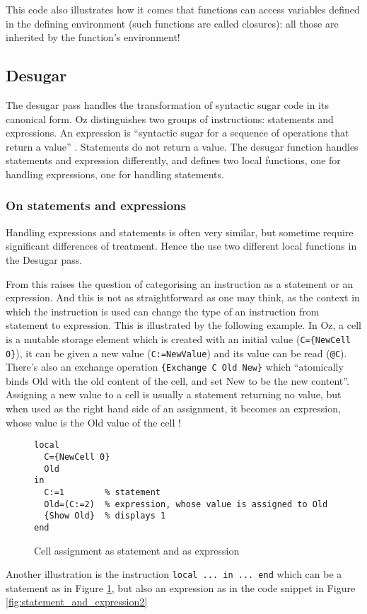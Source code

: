 \documentclass[a4paper]{memoir}
\begin{document}
This code also illustrates how it comes that functions can access variables defined in the defining environment (such functions are called closures): all those are inherited by the function's environment!




\subsection{Desugar}\label{sec:arch:desugar}
The desugar pass handles the transformation of syntactic sugar code in its canonical form.
Oz distinguishes two groups of instructions: statements and expressions. An expression is ``syntactic sugar for a sequence of operations that return a value'' . Statements do not return a value.
The desugar function handles statements and expression differently, and defines two local functions, one for handling expressions, one for handling statements.
\subsubsection{On statements and expressions}
Handling expressions and statements is often very similar, but sometime require significant differences of treatment. Hence the use two different local functions in the Desugar pass.

From this raises the question of categorising an instruction as a statement or an expression. And this is not as straightforward as one may think, as the context in which the instruction is used can change the type of an instruction from statement to expression. This is illustrated by the following example.
In Oz, a cell is a mutable storage element which is created with an initial value (\lstinline!C={NewCell 0}!), it can be given a new value (\lstinline!C:=NewValue!) and its value can be read (\lstinline!@C!). There's also an exchange operation \lstinline!{Exchange C Old New}! which ``atomically binds Old with the old content of the cell, and set New to be the new content''.%
Assigning a new value to a cell is usually a statement returning no value, but when used as the right hand side of an assignment, it becomes an expression, whose value is the Old value of the cell !
\begin{figure}[h]
\begin{lstlisting}
local
  C={NewCell 0}
  Old
in
  C:=1        % statement
  Old=(C:=2)  % expression, whose value is assigned to Old
  {Show Old}  % displays 1
end

\end{lstlisting}
\caption{Cell assignment as statement and as expression}
\label{fig:statement_and_expression1}
\end{figure}
Another illustration is the instruction \lstinline!local ... in ... end! which can be a statement as in Figure \ref{fig:statement_and_expression1}, but also an expression as in the code snippet in Figure \ref{fig:statement_and_expression2}
\end{document}
